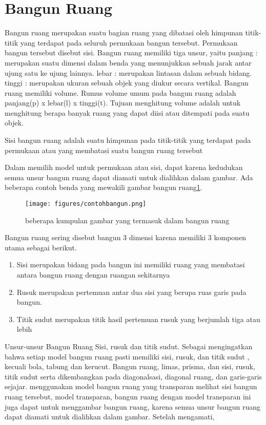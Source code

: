 	
\section{Bangun Ruang}
Bangun ruang merupakan suatu bagian ruang yang dibatasi oleh himpunan titik-titik yang terdapat pada seluruh permukaan bangun tersebut. 
Permukaan bangun tersebut disebut sisi. Bangun ruang memiliki tiga unsur, yaitu 
panjang : merupakan suatu dimensi dalam benda yang menunjukkan sebuah jarak antar ujung satu ke ujung lainnya.
lebar   : merupakan lintasan dalam sebuah bidang.
tinggi  : merupakan ukuran sebuah objek yang diukur secara vertikal.
Bangun ruang memiliki volume. Rumus volume umum pada bangun ruang adalah panjang(p) x lebar(l) x tinggi(t).
Tujuan menghitung volume adalah untuk menghitung berapa banyak ruang yang dapat diisi atau ditempati pada suatu objek.

Sisi bangun ruang adalah suatu himpunan pada titik-titik yang terdapat pada permukaan atau yang membatasi suatu bangun ruang tersebut \cite{umami2013eksperimentasi}

Dalam memilih model untuk permukaan atau sisi, dapat karena kedudukan semua unsur bangun ruang dapat diamati untuk dialihkan dalam gambar\cite{suharjana2008mengenal}. 
Ada beberapa contoh benda yang mewakili gambar bangun ruang\ref{contohbangun}.
\begin{figure}[ht]
    \centerline{\texttt{[image: figures/contohbangun.png]}}
    \caption{beberapa kumpulan gambar yang termasuk dalam bangun ruang}
    \label{contohbangun}
    \end{figure}
 
Bangun ruang sering  disebut bangun 3 dimensi karena memiliki 3 komponen utama sebagai berikut.
\begin{enumerate}
\item Sisi  merupakan bidang pada bangun ini memiliki ruang yang membatasi antara bangun ruang dengan ruangan sekitarnya 
\item Rusuk merupakan pertemuan antar dua sisi yang berupa ruas garis pada bangun.
\item Titik sudut merupakan titik hasil pertemuan rusuk yang berjumlah tiga atau lebih
\end{enumerate}

Unsur-unsur Bangun Ruang Sisi, rusuk dan titik sudut. Sebagai mengingatkan bahwa setiap model bangun ruang pasti memiliki sisi, rusuk, dan titik sudut , kecuali bola, tabung dan kerucut.
Bangun ruang, limas, prisma, dan sisi, rusuk, titik sudut serta dikembangkan pada diagonalsasi, diagonal ruang, dan garis-garis sejajar.
menggunakan model bangun ruang yang transparan  melihat sisi bangun ruang tersebut, model transparan, bangun ruang dengan model transparan ini juga dapat untuk menggambar bangun ruang, karena semua unsur bangun ruang dapat diamati untuk dialihkan dalam gambar. Setelah mengamati, 

